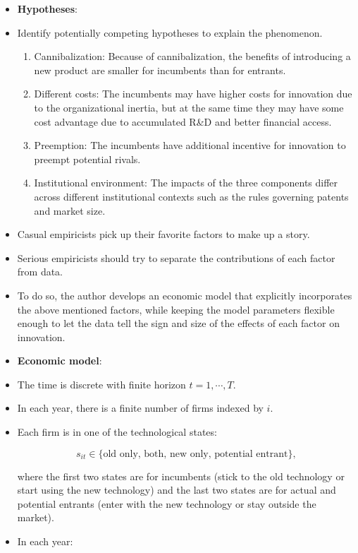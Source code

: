 \documentclass[]{book}
\providecommand{\tightlist}{%
  \setlength{\itemsep}{0pt}\setlength{\parskip}{0pt}}
\theoremstyle{definition}
\theoremstyle{definition}
\theoremstyle{definition}
\theoremstyle{remark}
\begin{document}
\begin{itemize}
\item
  \textbf{Hypotheses}:
\item
  Identify potentially competing hypotheses to explain the phenomenon.

  \begin{enumerate}
  \def\labelenumi{\arabic{enumi}.}
  \tightlist
  \item
    Cannibalization: Because of cannibalization, the benefits of
    introducing a new product are smaller for incumbents than for
    entrants.
  \item
    Different costs: The incumbents may have higher costs for innovation
    due to the organizational inertia, but at the same time they may
    have some cost advantage due to accumulated R\&D and better
    financial access.
  \item
    Preemption: The incumbents have additional incentive for innovation
    to preempt potential rivals.
  \item
    Institutional environment: The impacts of the three components
    differ across different institutional contexts such as the rules
    governing patents and market size.
  \end{enumerate}
\item
  Casual empiricists pick up their favorite factors to make up a story.
\item
  Serious empiricists should try to separate the contributions of each
  factor from data.
\item
  To do so, the author develops an economic model that explicitly
  incorporates the above mentioned factors, while keeping the model
  parameters flexible enough to let the data tell the sign and size of
  the effects of each factor on innovation.
\item
  \textbf{Economic model}:
\item
  The time is discrete with finite horizon \(t = 1, \cdots, T\).
\item
  In each year, there is a finite number of firms indexed by \(i\).
\item
  Each firm is in one of the technological states:

  \begin{equation}
  s_{it} \in \{\text{old only, both, new only, potential entrant}\},
  \end{equation}

  where the first two states are for incumbents (stick to the old
  technology or start using the new technology) and the last two states
  are for actual and potential entrants (enter with the new technology
  or stay outside the market).
\item
  In each year:


\end{itemize}
\end{document}
